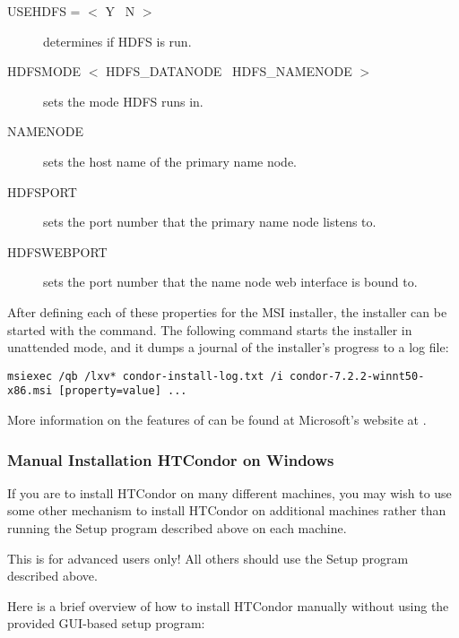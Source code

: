 \begin{description}
\item[USEHDFS = $<$ Y \Bar\ N $>$]
determines if HDFS is run.

\item[HDFSMODE $<$ HDFS\_DATANODE \Bar\ HDFS\_NAMENODE $>$]
sets the mode HDFS runs in.

\item[NAMENODE]
sets the host name of the primary name node.

\item[HDFSPORT]
sets the port number that the primary name node listens to.

\item [HDFSWEBPORT]
sets the port number that the name node web interface is bound to.
\end {description}

After defining each of these properties for the MSI installer, the
installer can be started with the  command. The following
command starts the installer in unattended mode, and it dumps a journal of
the installer's progress to a log file:
\footnotesize
\begin{verbatim}
msiexec /qb /lxv* condor-install-log.txt /i condor-7.2.2-winnt50-x86.msi [property=value] ... 
\end{verbatim}
\normalsize

More information on the features of 
can be found at Microsoft's website at
.

\subsubsection{\label{sec:NT-Manual-Install}Manual Installation HTCondor on Windows}

If you are to install HTCondor on many different machines, you may wish
to use some other mechanism to install HTCondor on additional machines
rather than running the Setup program described above on each machine.

\Warn This is for advanced users only!  All others should use the Setup program described above. 

Here is a brief overview of how to install HTCondor manually without using the provided GUI-based setup program:

